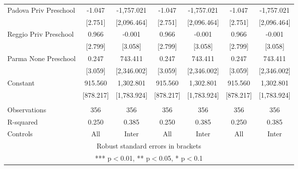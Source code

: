 \begin{tabular}{lcccccc}
Padova Priv Preschool & -1.047 & -1,757.021 & -1.047 & -1,757.021 & -1.047 & -1,757.021 \\
 & [2.751] & [2,096.464] & [2.751] & [2,096.464] & [2.751] & [2,096.464] \\
Reggio Priv Preschool & 0.966 & -0.001 & 0.966 & -0.001 & 0.966 & -0.001 \\
 & [2.799] & [3.058] & [2.799] & [3.058] & [2.799] & [3.058] \\
Parma None Preschool & 0.247 & 743.411 & 0.247 & 743.411 & 0.247 & 743.411 \\
 & [3.059] & [2,346.002] & [3.059] & [2,346.002] & [3.059] & [2,346.002] \\
Constant & 915.560 & 1,302.801 & 915.560 & 1,302.801 & 915.560 & 1,302.801 \\
 & [878.217] & [1,783.924] & [878.217] & [1,783.924] & [878.217] & [1,783.924] \\
 &  &  &  &  &  &  \\
Observations & 356 & 356 & 356 & 356 & 356 & 356 \\
R-squared & 0.250 & 0.385 & 0.250 & 0.385 & 0.250 & 0.385 \\
 Controls & All & Inter & All & Inter & All & Inter \\ \hline
\multicolumn{7}{c}{ Robust standard errors in brackets} \\
\multicolumn{7}{c}{ *** p$<$0.01, ** p$<$0.05, * p$<$0.1} \\
\end{tabular}

